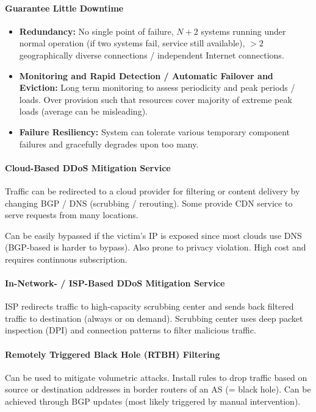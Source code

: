 \paragraph{Guarantee Little Downtime}
\begin{itemize}
    \item \textbf{Redundancy:} No single point of failure, $N+2$ systems running under normal operation (if two systems fail, service still available), $> 2$ geographically diverse connections / independent Internet connections.
    \item \textbf{Monitoring and Rapid Detection / Automatic Failover and Eviction:} Long term monitoring to assess periodicity and peak periods / loads. Over provision such that resources cover majority of extreme peak loads (average can be misleading).
    \item \textbf{Failure Resiliency:} System can tolerate various temporary component failures and gracefully degrades upon too many.
\end{itemize}

\paragraph{Cloud-Based DDoS Mitigation Service}
Traffic can be redirected to a cloud provider for filtering or content delivery by changing BGP / DNS (scrubbing / rerouting). Some provide CDN service to serve requests from many locations.

Can be easily bypassed if the victim's IP is exposed since most clouds use DNS (BGP-based is harder to bypass). Also prone to privacy violation. High cost and requires continuous subscription.

\paragraph{In-Network- / ISP-Based DDoS Mitigation Service}
ISP redirects traffic to high-capacity scrubbing center and sends back filtered traffic to destination (always or on demand). Scrubbing center uses deep packet inspection (DPI) and connection patterns to filter malicious traffic.

\paragraph{Remotely Triggered Black Hole (RTBH) Filtering}
Can be used to mitigate volumetric attacks. Install rules to drop traffic based on source or destination addresses in border routers of an AS (= black hole). Can be achieved through BGP updates (most likely triggered by manual intervention).




